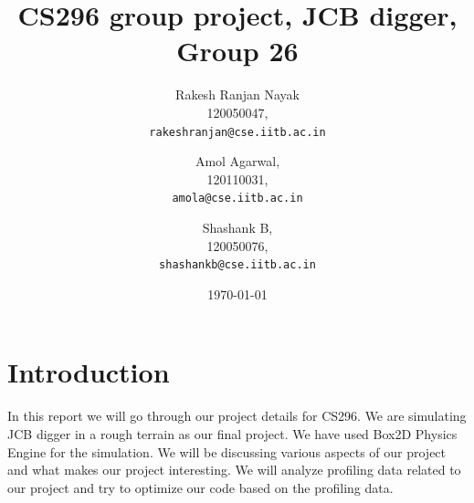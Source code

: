 \documentclass[11pt]{article}
\begin{document}
\title{CS296 group project, JCB digger, Group 26}
\author{Rakesh Ranjan Nayak\\
  120050047,\\
  \texttt{rakeshranjan@cse.iitb.ac.in}
  \and
  Amol Agarwal,\\
  120110031,\\
  \texttt{amola@cse.iitb.ac.in}
  \and 
  Shashank B, \\
  120050076, \\
  \texttt{shashankb@cse.iitb.ac.in}
  }
    
\date{\today}
\maketitle

\section{Introduction}
In this report we will go through our project details for CS296. We are simulating JCB digger in a rough terrain as our final project. We have used
Box2D Physics Engine for the simulation. We will be discussing various aspects of our project and what makes our project interesting. We will analyze 
profiling data related to our project and try to optimize our code based on the profiling data.
\end{document}
